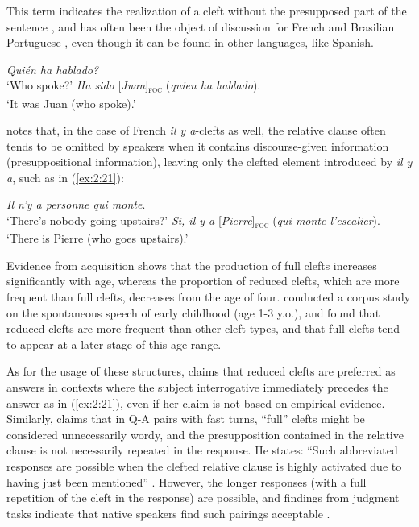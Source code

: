 This term indicates the realization of a cleft without the presupposed part of the sentence \parencite{frascarelli2013pseudo}, and has often been the object of discussion for French and Brasilian Portuguese \parencite{lobo20172}, even though it can be found in other languages, like Spanish.

\ea \label{ex:2:20}
\ea  \textit{Quién ha hablado?}\\
 `Who spoke?'
\ex \textit{Ha sido} {[\textit{Juan}]\textsubscript{\textsc{foc}}} \normalsize (\textit{quien ha hablado}).\\
`It was Juan (who spoke).'

\z \z


\textcite{karssenberg2017oiseaux} notes that, in the case of French \textit{il y a}-clefts as well, the relative clause often tends to be omitted by speakers when it contains discourse-given information (presuppositional information), leaving only the clefted element introduced by \textit{il y a}, such as in (\ref{ex:2:21}):


\ea \label{ex:2:21}
\ea  \textit{Il n’y a personne qui monte}.\\
 `There's nobody going upstairs?'
\ex \textit{Si, il y a} {[\textit{Pierre}]\textsubscript{\textsc{foc}}} \normalsize (\textit{qui monte l’escalier}).\\
`There is Pierre (who goes upstairs).' \hfill \parencite[202]{karssenberg2017oiseaux}    
\z \z


Evidence from acquisition \parencite{lobo2019effects} shows that the production of full clefts increases significantly with age, whereas the proportion of reduced clefts, which are more frequent than full clefts, decreases from the age of four. \textcite{lahousse2019emergence} conducted a corpus study on the spontaneous speech of early childhood (age 1-3 y.o.), and found that reduced clefts are more frequent than other cleft types, and that full clefts tend to appear at a later stage of this age range. 

As for the usage of these structures, \textcite{belletti2005answering} claims that reduced clefts are preferred as answers in contexts where the subject interrogative immediately precedes the answer as in (\ref{ex:2:21}), even if her claim is not based on empirical evidence. Similarly, \textcite{reichle2014cleft} claims that in Q-A pairs with fast turns, ``full” clefts might be considered unnecessarily wordy, and the presupposition contained in the relative clause is not necessarily repeated in the response. He states: “Such abbreviated responses are possible when the clefted relative clause is highly activated due to having just been mentioned” \parencite[8]{reichle2014cleft}. However, the longer responses (with a full repetition of the cleft in the response) are possible, and findings from judgment tasks indicate that native speakers find such pairings acceptable \parencite{reichle2014cleft}.

